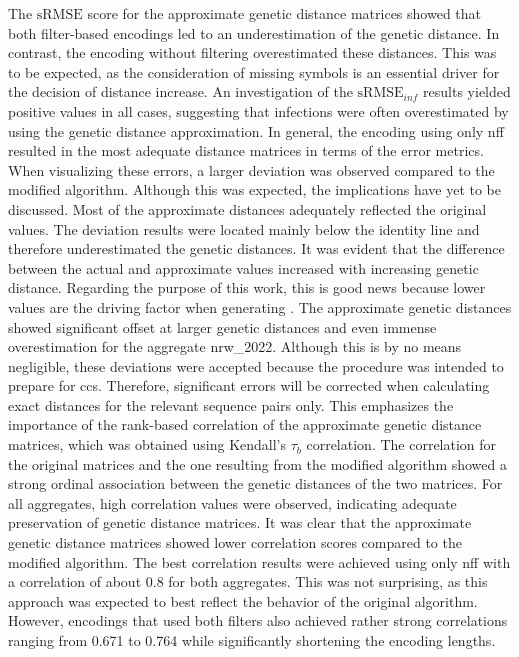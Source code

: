 The $\text{sRMSE}$ score for the approximate genetic distance matrices showed that both filter-based encodings led to an underestimation of the genetic distance. In contrast, the encoding without filtering overestimated these distances. This was to be expected, as the consideration of missing symbols is an essential driver for the decision of distance increase. 
An investigation of the $\text{sRMSE}_{inf}$ results yielded positive values in all cases, suggesting that infections were often overestimated by using the genetic distance approximation. In general, the encoding using only \acrshort{nff} resulted in the most adequate distance matrices in terms of the error metrics. When visualizing these errors, a larger deviation was observed compared to the modified algorithm. Although this was expected, the implications have yet to be discussed. Most of the approximate distances adequately reflected the original values. The deviation results were located mainly below the identity line and therefore underestimated the genetic distances. It was evident that the difference between the actual and approximate values increased with increasing genetic distance. Regarding the purpose of this work, this is good news because lower values are the driving factor when generating . The approximate genetic distances showed significant offset at larger genetic distances and even immense overestimation for the aggregate nrw\_2022. Although this is by no means negligible, these deviations were accepted because the procedure was intended to prepare for \acrshort{ccs}. Therefore, significant errors will be corrected when calculating exact distances for the relevant sequence pairs only. This emphasizes the importance of the rank-based correlation of the approximate genetic distance matrices, which was obtained using Kendall's $\tau_b$ correlation. The correlation for the original matrices and the one resulting from the modified algorithm showed a strong ordinal association between the genetic distances of the two matrices. For all aggregates, high correlation values were observed, indicating adequate preservation of genetic distance matrices. It was clear that the approximate genetic distance matrices showed lower correlation scores compared to the modified algorithm. The best correlation results were achieved using only \acrshort{nff} with a correlation of about 0.8 for both aggregates. This was not surprising, as this approach was expected to best reflect the behavior of the original algorithm. However, encodings that used both filters also achieved rather strong correlations ranging from 0.671 to 0.764 while significantly shortening the encoding lengths.

